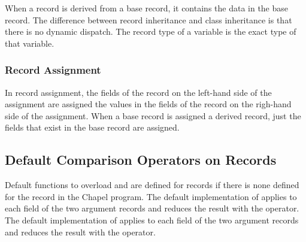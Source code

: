 When a record is derived from a base record, it contains the data in
the base record.  The difference between record inheritance and class
inheritance is that there is no dynamic dispatch.  The record type of
a variable is the exact type of that variable.

\subsubsection{Record Assignment}
\label{Record_Assignment}

In record assignment, the fields of the record on the left-hand side
of the assignment are assigned the values in the fields of the record
on the righ-hand side of the assignment.  When a base record is
assigned a derived record, just the fields that exist in the base
record are assigned.

\subsection{Default Comparison Operators on Records}
\label{Record_Comparison_Operators}

Default functions to overload \chpl{==} and \chpl{!=} are defined for
records if there is none defined for the record in the Chapel program.
The default implementation of \chpl{==} applies \chpl{==} to each
field of the two argument records and reduces the result with
the \chpl{&&} operator.  The default implementation of \chpl{!=}
applies \chpl{!=} to each field of the two argument records and
reduces the result with the \chpl{||} operator.
